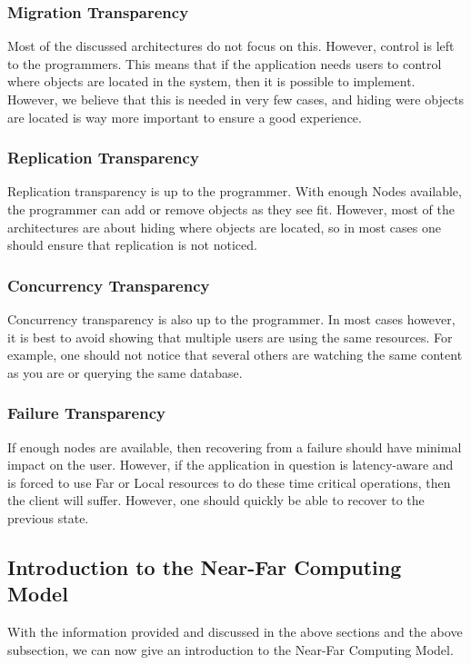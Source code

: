 \subsubsection{Migration Transparency}
Most of the discussed architectures do not focus on this. However, control is left to the programmers. This means that if the application needs users to control where objects are located in the system, then it is possible to implement. However, we believe that this is needed in very few cases, and hiding were objects are located is way more important to ensure a good experience.

\subsubsection{Replication Transparency}
Replication transparency is up to the programmer. With enough Nodes available, the programmer can add or remove objects as they see fit. However, most of the architectures are about hiding where objects are located, so in most cases one should ensure that replication is not noticed.

\subsubsection{Concurrency Transparency}
Concurrency transparency is also up to the programmer. In most cases however, it is best to avoid showing that multiple users are using the same resources. For example, one should not notice that several others are watching the same content as you are or querying the same database. 

\subsubsection{Failure Transparency}
If enough nodes are available, then recovering from a failure should have minimal impact on the user. However, if the application in question is latency-aware and is forced to use Far or Local resources to do these time critical operations, then the client will suffer. However, one should quickly be able to recover to the previous state.

\subsection{Introduction to the Near-Far Computing Model}
With the information provided and discussed in the above sections and the above subsection, we can now give an introduction to the Near-Far Computing Model.

